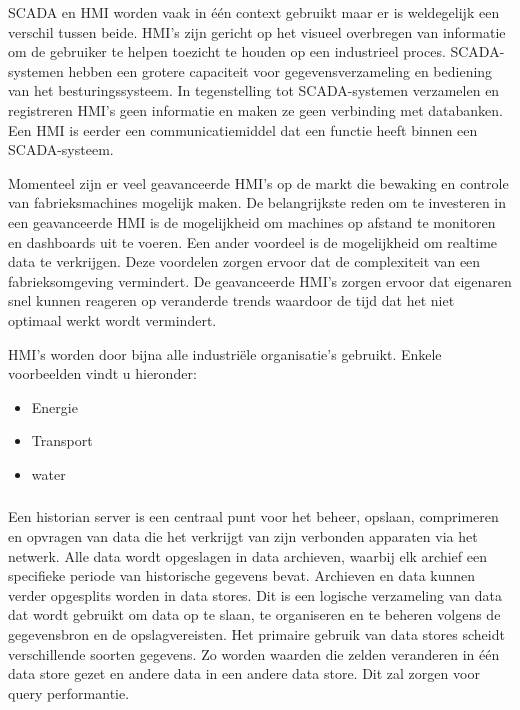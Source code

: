 SCADA en HMI worden vaak in één context gebruikt maar er is weldegelijk een verschil tussen beide. HMI's zijn gericht op het visueel overbregen van informatie om de gebruiker te helpen toezicht te houden op een industrieel proces. SCADA-systemen hebben een grotere capaciteit voor gegevensverzameling en bediening van het besturingssysteem. In tegenstelling tot SCADA-systemen  verzamelen en registreren HMI's geen informatie en maken ze geen verbinding met databanken. Een HMI is eerder een communicatiemiddel dat een functie heeft binnen een SCADA-systeem.~\autocite{2018}

Momenteel zijn er veel geavanceerde HMI's op de markt die bewaking en controle van fabrieksmachines mogelijk maken. De belangrijkste reden om te investeren in een geavanceerde HMI is de mogelijkheid om machines op afstand te monitoren en dashboards uit te voeren. Een ander voordeel is de mogelijkheid om realtime data te verkrijgen. Deze voordelen zorgen ervoor dat de complexiteit van een fabrieksomgeving vermindert. De geavanceerde HMI's zorgen ervoor dat eigenaren snel kunnen reageren op veranderde trends waardoor de tijd dat het niet optimaal werkt wordt vermindert.~\autocite{Exor2019} 

HMI's worden door bijna alle industriële organisatie's gebruikt. Enkele voorbeelden vindt u hieronder:~\autocite{2018}
\begin{itemize}
    \item Energie
    \item Transport
    \item water
\end{itemize}

\subsubsection{}
\label{subsubsec:Historian}
Een historian server is een centraal punt voor het beheer, opslaan, comprimeren en opvragen van data die het verkrijgt van zijn verbonden apparaten via het netwerk. Alle data wordt opgeslagen in data archieven, waarbij elk archief een specifieke periode van historische gegevens bevat. Archieven en data kunnen verder opgesplits worden in data stores. Dit is een logische verzameling van data dat wordt gebruikt om data op te slaan, te organiseren en te beheren volgens de gegevensbron en de opslagvereisten. Het primaire gebruik van data stores scheidt verschillende soorten gegevens. Zo worden waarden die zelden veranderen in één data store gezet en andere data in een andere data store. Dit zal zorgen voor query performantie.~\autocite{Solutions}

